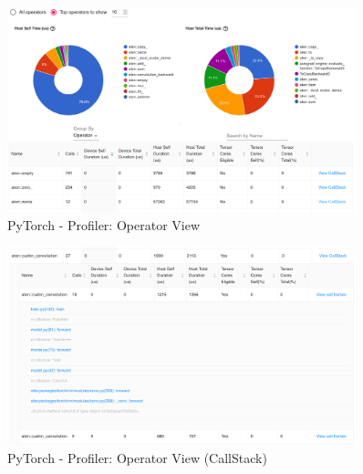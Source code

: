\documentclass[12pt, a4paper, hidelinks]{article}
\begin{document}
\begin{figure}[H]
\centering
\includegraphics[width=0.9\textwidth]{./assets/scap_gtx1080_profiler-torch_batch-size-64_14650758_operator-view}
\caption[PyTorch - Profiler: Operator View]{PyTorch - Profiler: Operator View}
\label{fig:scap_gtx1080_profiler-torch_batch-size-64_14650758_operator-view}
\end{figure}

\begin{figure}[H]
\centering
\includegraphics[width=0.9\textwidth]{./assets/scap_gtx1080_profiler-torch_batch-size-64_14650758_operator-view-details}
\caption[PyTorch - Profiler: Operator View (CallStack)]{PyTorch - Profiler: Operator View (CallStack)}
\label{fig:scap_gtx1080_profiler-torch_batch-size-64_14650758_operator-view-details}
\end{figure}
\end{document}
